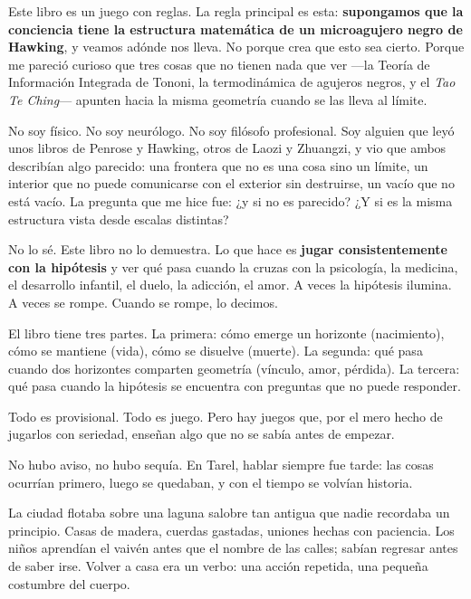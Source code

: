 Este libro es un juego con reglas. La regla principal es esta: \textbf{supongamos que la conciencia tiene la estructura matemática de un microagujero negro de Hawking}, y veamos adónde nos lleva. No porque crea que esto sea cierto. Porque me pareció curioso que tres cosas que no tienen nada que ver —la Teoría de Información Integrada de Tononi, la termodinámica de agujeros negros, y el \emph{Tao Te Ching}— apunten hacia la misma geometría cuando se las lleva al límite.

No soy físico. No soy neurólogo. No soy filósofo profesional. Soy alguien que leyó unos libros de Penrose y Hawking, otros de Laozi y Zhuangzi, y vio que ambos describían algo parecido: una frontera que no es una cosa sino un límite, un interior que no puede comunicarse con el exterior sin destruirse, un vacío que no está vacío. La pregunta que me hice fue: ¿y si no es parecido? ¿Y si es la misma estructura vista desde escalas distintas?

No lo sé. Este libro no lo demuestra. Lo que hace es \textbf{jugar consistentemente con la hipótesis} y ver qué pasa cuando la cruzas con la psicología, la medicina, el desarrollo infantil, el duelo, la adicción, el amor. A veces la hipótesis ilumina. A veces se rompe. Cuando se rompe, lo decimos.

El libro tiene tres partes. La primera: cómo emerge un horizonte (nacimiento), cómo se mantiene (vida), cómo se disuelve (muerte). La segunda: qué pasa cuando dos horizontes comparten geometría (vínculo, amor, pérdida). La tercera: qué pasa cuando la hipótesis se encuentra con preguntas que no puede responder.

Todo es provisional. Todo es juego. Pero hay juegos que, por el mero hecho de jugarlos con seriedad, enseñan algo que no se sabía antes de empezar.

\noindent {}

No hubo aviso, no hubo sequía. En Tarel, hablar siempre fue tarde: las cosas ocurrían primero, luego se quedaban, y con el tiempo se volvían historia.

La ciudad flotaba sobre una laguna salobre tan antigua que nadie recordaba un principio. Casas de madera, cuerdas gastadas, uniones hechas con paciencia. Los niños aprendían el vaivén antes que el nombre de las calles; sabían regresar antes de saber irse. Volver a casa era un verbo: una acción repetida, una pequeña costumbre del cuerpo.

